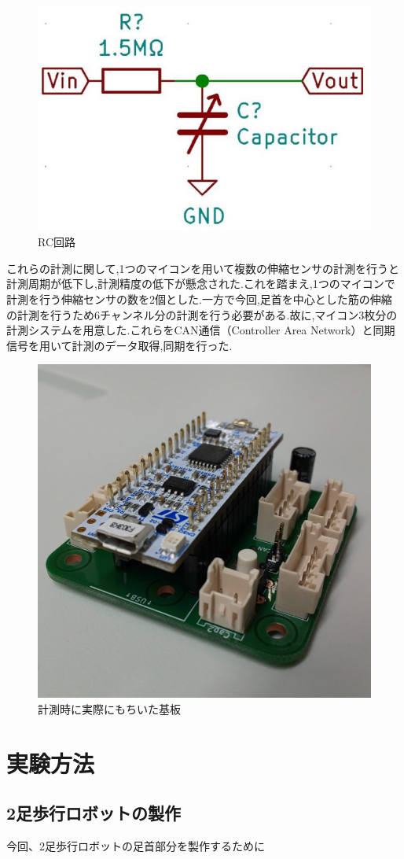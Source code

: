 \begin{figure}[h]
 \begin{center}
  \includegraphics[width=0.5\columnwidth,clip]{Photo/BackGround/RC.eps}
  \caption{RC回路}
  \label{RC}
 \end{center}
\end{figure}

これらの計測に関して,1つのマイコンを用いて複数の伸縮センサの計測を行うと計測周期が低下し,計測精度の低下が懸念された.これを踏まえ,1つのマイコンで計測を行う伸縮センサの数を2個とした.一方で今回,足首を中心とした筋の伸縮の計測を行うため6チャンネル分の計測を行う必要がある.故に,マイコン3枚分の計測システムを用意した.これらをCAN通信（Controller Area Network）と同期信号を用いて計測のデータ取得,同期を行った.
\begin{figure}[h]
 \begin{center}
  \includegraphics[width=0.5\columnwidth,clip]{Photo/BackGround/circuit.eps}
  \caption{計測時に実際にもちいた基板}
  \label{circuit}
 \end{center}
\end{figure}

\section{実験方法}
\subsection{2足歩行ロボットの製作}
今回、2足歩行ロボットの足首部分を製作するために

